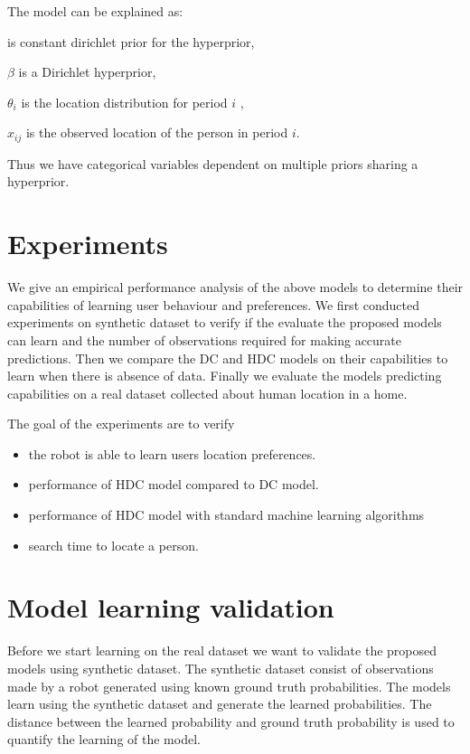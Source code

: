 The model can be explained as:

	\boldmath{$\alpha$} is  constant dirichlet prior for the hyperprior, 
	
	$\beta$ is a Dirichlet hyperprior,
	
	$\theta_i$ is the location distribution for period $i$  ,
	
	$x_{ij}$ is the observed location of the person in period $i$.
	
Thus we have categorical variables dependent on multiple priors sharing a hyperprior.


\section{Experiments}

We give an empirical performance analysis of the above models to determine their capabilities of learning user behaviour and preferences. We first conducted experiments on synthetic dataset to verify if the evaluate the proposed models can learn and the number of observations required for making accurate predictions. Then we compare the DC and HDC models on their capabilities to learn when there is absence of data. Finally we evaluate the models predicting capabilities on a real dataset collected about human location in a home.

The goal of the experiments are to verify 
\begin{itemize}
	\item the robot is able to learn users location preferences.
	\item performance of HDC model compared to DC model.
	\item performance of HDC model with standard machine learning algorithms
	\item search time to locate a person.
\end{itemize}


\section{Model learning validation}

Before we start learning on the real dataset we want to validate the proposed models using synthetic dataset. The synthetic dataset consist of observations made by a robot generated using known ground truth probabilities. The models learn using the synthetic dataset and generate the learned probabilities. The distance between the learned probability and ground truth probability is used to quantify the learning of the model. 

